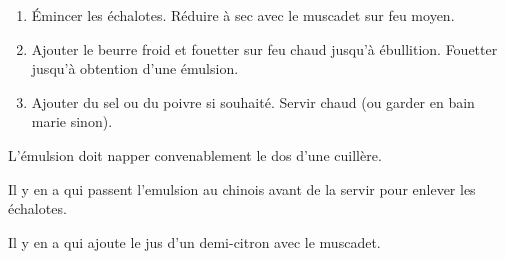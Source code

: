 
\begin{ingredients}
\end{ingredients}


\begin{recipe}
  \begin{enumerate}

  \item \'Emincer les \'echalotes.  R\'eduire \`a sec avec le muscadet
    sur feu moyen.

  \item Ajouter le beurre froid et fouetter sur feu chaud jusqu'\`a
    \'ebullition.  Fouetter jusqu'\`a obtention d'une \'emulsion.

  \item Ajouter du sel ou du poivre si souhait\'e.  Servir chaud (ou
    garder en bain marie sinon).

  \end{enumerate}

  L'\'emulsion doit napper convenablement le dos d'une cuill\`ere.
  
  Il y en a qui passent l'emulsion au chinois avant de la servir pour
  enlever les \'echalotes.

  Il y en a qui ajoute le jus d'un demi-citron avec le muscadet.
\end{recipe}

